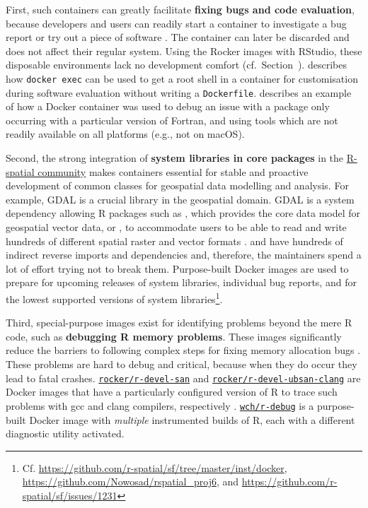 First, such containers can greatly facilitate \textbf{fixing bugs and
code evaluation}, because developers and users can readily start a
container to investigate a bug report or try out a piece of software
\citep[cf.][]{ooms_opencpu_2017}. The container can later be discarded
and does not affect their regular system. Using the Rocker images with
RStudio, these disposable environments lack no development comfort
(cf.~Section~). \citet{ooms_opencpu_2017} describes
how \texttt{docker\ exec} can be used to get a root shell in a container
for customisation during software evaluation without writing a
\texttt{Dockerfile}. \citet{eddelbuettel_debugging_2019} describes an
example of how a Docker container was used to debug an issue with a
package only occurring with a particular version of Fortran, and using
tools which are not readily available on all platforms (e.g., not on
macOS).

Second, the strong integration of \textbf{system libraries in core
packages} in the \href{https://www.r-spatial.org/}{R-spatial community}
makes containers essential for stable and proactive development of
common classes for geospatial data modelling and analysis. For example,
GDAL \citep{gdal_2019} is a crucial library in the geospatial domain.
GDAL is a system dependency allowing R packages such as ,
which provides the core data model for geospatial vector data, or
, to accommodate users to be able to read and write
hundreds of different spatial raster and vector formats
\citep{pebesma_simple_2018,cran_rgdal}.  and  have
hundreds of indirect reverse imports and dependencies and, therefore,
the maintainers spend a lot of effort trying not to break them.
Purpose-built Docker images are used to prepare for upcoming releases of
system libraries, individual bug reports, and for the lowest supported
versions of system
libraries\footnote{Cf. \href{https://github.com/r-spatial/sf/tree/master/inst/docker}{https://github.com/r-spatial/sf/tree/master/inst/docker}, \href{https://github.com/Nowosad/rspatial_proj6}{https://github.com/Nowosad/rspatial\_proj6}, and \href{https://github.com/r-spatial/sf/issues/1231}{https://github.com/r-spatial/sf/issues/1231}}.

Third, special-purpose images exist for identifying problems beyond the
mere R code, such as \textbf{debugging R memory problems}. These images
significantly reduce the barriers to following complex steps for fixing
memory allocation bugs \citep[cf. Section~4.3 in][]{core_writing_1999}.
These problems are hard to debug and critical, because when they do
occur they lead to fatal crashes.
\href{https://github.com/rocker-org/r-devel-san}{\texttt{rocker/r-devel-san}}
and
\href{https://github.com/rocker-org/r-devel-san-clang}{\texttt{rocker/r-devel-ubsan-clang}}
are Docker images that have a particularly configured version of R to
trace such problems with gcc and clang compilers, respectively
\citep[cf.~ for examples,][]{eddelbuettel_sanitizers_2014}.
\href{https://github.com/wch/r-debug}{\texttt{wch/r-debug}} is a
purpose-built Docker image with \emph{multiple} instrumented builds of
R, each with a different diagnostic utility activated.

